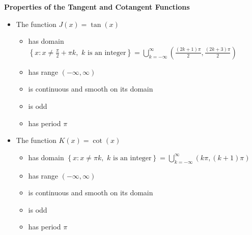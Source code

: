 \smallskip

\colorbox{ResultColor}{\bbm

\begin{thm} \label{tangentcotangentfunctionprops}  \textbf{Properties of the Tangent and Cotangent Functions}  

\begin{itemize}

\item  The function $J(x) = \tan(x)$

\begin{itemize}


\item has domain $\left\{ x : x \neq \frac{\pi}{2} + \pi k, \, \,  \text{$k$ is an integer} \right\} = \displaystyle{\bigcup_{k=-\infty}^{\infty} \left(\frac{(2k+1) \pi}{2}, \frac{(2k+3) \pi}{2}\right)}$

\item has range $(-\infty, \infty)$

\item is continuous and smooth on its domain

\item is odd

\item has period $\pi$

\end{itemize}

\item  The function $K(x) = \cot(x)$

\begin{itemize}

\item has domain $\left\{ x : x \neq \pi  k, \, \,  \text{$k$ is an integer} \right\} = \displaystyle{\bigcup_{k=-\infty}^{\infty}\left(k\pi, (k+1) \pi \right)}$

\item has range $(-\infty, \infty)$

\item is continuous and smooth on its domain

\item is odd

\item has period $\pi$

\end{itemize}

\end{itemize}

\end{thm}

\ebm}

